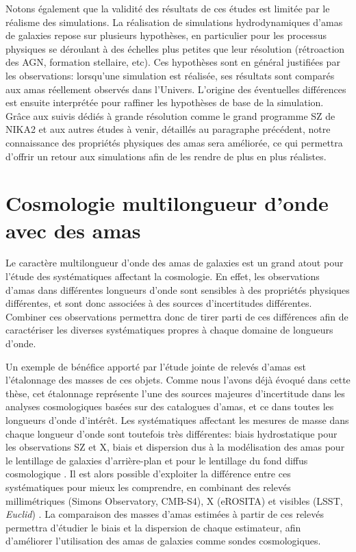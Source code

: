 Notons également que la validité des résultats de ces études est limitée par le réalisme des simulations.
La réalisation de simulations hydrodynamiques d'amas de galaxies repose sur plusieurs hypothèses, en particulier pour les processus physiques se déroulant à des échelles plus petites que leur résolution (rétroaction des AGN, formation stellaire, etc).
Ces hypothèses sont en général justifiées par les observations: lorsqu'une simulation est réalisée, ses résultats sont comparés aux amas réellement observés dans l'Univers.
L'origine des éventuelles différences est ensuite interprétée pour raffiner les hypothèses de base de la simulation.
Grâce aux suivis dédiés à grande résolution comme le grand programme SZ de NIKA2 et aux autres études à venir, détaillés au paragraphe précédent, notre connaissance des propriétés physiques des amas sera améliorée, ce qui permettra d'offrir un retour aux simulations afin de les rendre de plus en plus réalistes.

\section*{Cosmologie multilongueur d'onde avec des amas}

Le caractère multilongueur d'onde des amas de galaxies est un grand atout pour l'étude des systématiques affectant la cosmologie.
En effet, les observations d'amas dans différentes longueurs d'onde sont sensibles à des propriétés physiques différentes, et sont donc associées à des sources d'incertitudes différentes.
Combiner ces observations permettra donc de tirer parti de ces différences afin de caractériser les diverses systématiques propres à chaque domaine de longueurs d'onde.

Un exemple de bénéfice apporté par l'étude jointe de relevés d'amas est l'étalonnage des masses de ces objets.
Comme nous l'avons déjà évoqué dans cette thèse, cet étalonnage représente l'une des sources majeures d'incertitude dans les analyses cosmologiques basées sur des catalogues d'amas, et ce dans toutes les longueurs d'onde d'intérêt.
Les systématiques affectant les mesures de masse dans chaque longueur d'onde sont toutefois très différentes: biais hydrostatique pour les observations SZ et X, biais et dispersion dus à la modélisation des amas pour le lentillage de galaxies d'arrière-plan \cite{grandis_calibration_2021,sommer_weak_2021} et pour le lentillage du fond diffus cosmologique \cite{zubeldia_cosmological_2019}.
Il est alors possible d'exploiter la différence entre ces systématiques pour mieux les comprendre, en combinant des relevés millimétriques (Simons Observatory, CMB-S4), X (eROSITA) et visibles (LSST, \textit{Euclid}) \cite{rhodes_scientific_2017,dodelson_cosmic_2016}.
La comparaison des masses d'amas estimées à partir de ces relevés permettra d'étudier le biais et la dispersion de chaque estimateur, afin d'améliorer l'utilisation des amas de galaxies comme sondes cosmologiques.

